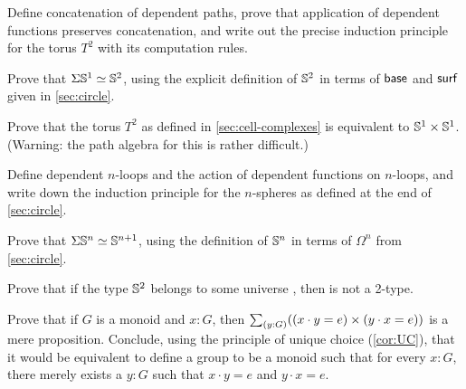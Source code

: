 \documentclass[hott-all.tex]{subfiles}
\begin{document}
% 
\sectionExercises
% 
\begin{ex}
  Define concatenation of dependent paths, prove that application of dependent functions preserves concatenation, and write out the precise induction principle for the torus $T^2$ with its computation rules.
\end{ex}
% 
\begin{ex}
  Prove that $\Sigma \mathbb{S}^1 \simeq \mathbb{S}^2$, using the explicit definition of $\mathbb{S}^2$ in terms of $\mathsf{base}$ and $\mathsf{surf}$ given in \cref{sec:circle}.
\end{ex}
% 
\begin{ex}
  Prove that the torus $T^2$ as defined in \cref{sec:cell-complexes} is equivalent to $\mathbb{S}^1\times \mathbb{S}^1$.
  (Warning: the path algebra for this is rather difficult.)
\end{ex}
% 
\begin{ex}
  Define dependent $n$-loops and the action of dependent functions on $n$-loops, and write down the induction principle for the $n$-spheres as defined at the end of \cref{sec:circle}.
\end{ex}
% 
\begin{ex}
  Prove that $\Sigma \mathbb{S}^n \simeq \mathbb{S}^{n+1}$, using the definition of $\mathbb{S}^n$ in terms of $\Omega^n$ from \cref{sec:circle}.
\end{ex}
% 
\begin{ex}
  Prove that if the type $\mathbb{S}^2$ belongs to some universe \type, then \type is not a 2-type.
\end{ex}
% 
\begin{ex}
  Prove that if $G$ is a monoid and $x:G$, then $\sm{y:G}((x\cdot y = e) \times (y\cdot x =e))$ is a mere proposition.
  Conclude, using the principle of unique choice (\cref{cor:UC}), that it would be equivalent to define a group to be a monoid such that for every $x:G$, there merely exists a $y:G$ such that $x\cdot y = e$ and $y\cdot x=e$.
\end{ex}
\end{document}
